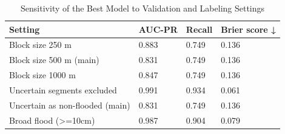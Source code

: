 \begin{table}
\caption{Sensitivity of the Best Model to Validation and Labeling Settings}
\label{tab:sensitivity}
\begin{tabular}{llll}
\toprule
Setting & AUC-PR & Recall & Brier score ↓ \\
\midrule
Block size 250 m & 0.883 & 0.749 & 0.136 \\
Block size 500 m (main) & 0.831 & 0.749 & 0.136 \\
Block size 1000 m & 0.847 & 0.749 & 0.136 \\
Uncertain segments excluded & 0.991 & 0.934 & 0.061 \\
Uncertain as non-flooded (main) & 0.831 & 0.749 & 0.136 \\
Broad flood (>=10cm) & 0.987 & 0.904 & 0.079 \\
\bottomrule
\end{tabular}
\end{table}
